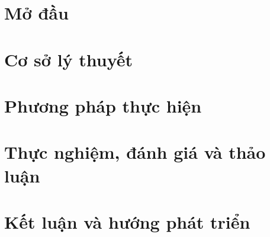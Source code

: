 \documentclass{template/thesis}
\begin{document}
\firstbeforepreface
\secondbeforepreface
\setcounter{page}{1}
\newpage
\afterpreface

\chapter{Mở đầu}
\label{c:intro}


\chapter{Cơ sở lý thuyết}
\label{c:cosolythuyet}



\chapter{Phương pháp thực hiện}
\label{c:phuongphapthuchien}


\chapter{Thực nghiệm, đánh giá và thảo luận}
\label{c:thucnghiemdanhgia}



\chapter{Kết luận và hướng phát triển}
\label{c:ketluanvaphattrien}



\appendix
\renewcommand{\cftchappresnum}{Phụ lục }
\addtocontents{toc}{\protect\renewcommand{\protect\cftchappresnum}{Phụ lục }}


\begingroup
\setlength{\emergencystretch}{8em}
\justifying\printbibliography[title=Tài liệu tham khảo]
\endgroup
{}
\end{document}
